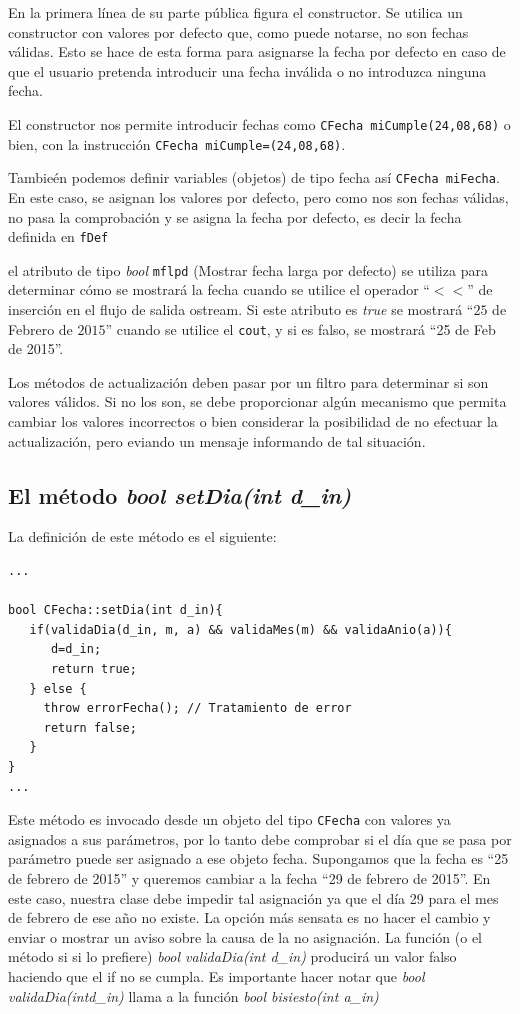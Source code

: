 \documentclass[10pt,a4paper]{article}
\begin{document}
En la primera l\'inea de su parte p\'ublica figura el constructor. Se utilica un constructor con valores por defecto que, como puede notarse, no son fechas v\'alidas. Esto se hace de esta forma para asignarse la fecha por defecto en caso de que el usuario pretenda introducir una fecha inv\'alida o no introduzca ninguna fecha.

El constructor nos permite introducir fechas como \texttt{CFecha miCumple(24,08,68)} o bien, con la instrucci\'on \texttt{CFecha miCumple=(24,08,68)}. 

Tambie\'en podemos definir variables (objetos) de tipo fecha as\'i \texttt{CFecha miFecha}. En este caso, se asignan los valores por defecto, pero como nos son fechas v\'alidas, no pasa la comprobaci\'on y se asigna la fecha por defecto, es decir la fecha definida en \texttt{fDef} 

el atributo de tipo \textit{bool} \texttt{mflpd} (Mostrar fecha larga por defecto) se utiliza para determinar c\'omo se mostrar\'a la fecha cuando se utilice el operador ``$<<$'' de inserci\'on en el flujo de salida ostream. Si este atributo es \textit{true} se mostrar\'a   ``$25$ de Febrero de $2015$'' cuando se utilice el \texttt{cout}, y si es falso, se mostrar\'a ``25 de Feb de 2015''.

Los m\'etodos de actualizaci\'on deben pasar por un filtro para determinar si son valores v\'alidos. Si no los son, se debe proporcionar alg\'un mecanismo que permita cambiar los valores incorrectos o bien considerar la posibilidad de no efectuar la actualizaci\'on, pero eviando un mensaje informando de tal situaci\'on.

\subsection*{El m\'etodo \textit{bool setDia(int d\_in)}}

La definici\'on de este m\'etodo es el siguiente:

\color{orange}
\begin{verbatim}
...

bool CFecha::setDia(int d_in){
   if(validaDia(d_in, m, a) && validaMes(m) && validaAnio(a)){
      d=d_in;
      return true;
   } else {
     throw errorFecha(); // Tratamiento de error
     return false;
   }
}
...

\end{verbatim}
\color{black}

Este m\'etodo es invocado desde un objeto del tipo \texttt{CFecha} con valores ya asignados a sus par\'ametros, por lo tanto debe comprobar si el d\'ia que se pasa por par\'ametro puede ser asignado a ese objeto fecha. Supongamos que la fecha es ``25 de febrero de 2015'' y queremos cambiar a la fecha ``29 de febrero de 2015''. En este caso, nuestra clase debe impedir tal asignaci\'on ya que el d\'ia 29 para el mes de febrero de ese a\~no no existe. La opci\'on m\'as sensata es no hacer el cambio y enviar o mostrar un aviso sobre la causa de la no asignaci\'on. La funci\'on (o el m\'etodo si si lo prefiere) \textit{bool validaDia(int d\_in)} producir\'a un valor falso haciendo que el if no se cumpla. Es importante hacer notar que \textit{bool validaDia(intd\_in)} llama a la funci\'on \textit{bool bisiesto(int a\_in)}
\end{document}
